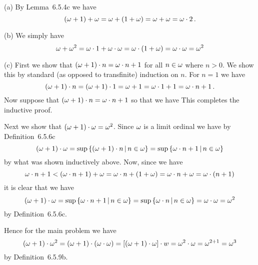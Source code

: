 
\begin{solution}
	(a) By Lemma~6.5.4c we have
    $$
    (\omega + 1) + \omega = \omega + (1 + \omega) = \omega + \omega = \omega \cdot 2 \,.
    $$

    (b) We simply have
    $$
    \omega + \omega^2 = \omega \cdot 1 + \omega \cdot \omega = \omega \cdot (1 + \omega) = \omega \cdot \omega = \omega^2
    $$

    (c) First we show that $(\omega+1) \cdot n = \omega \cdot n + 1$ for all $n \in \omega$ where $n > 0$.
    We show this by standard (as opposed to transfinite) induction on $n$.
    For $n=1$ we have
    $$
    (\omega + 1) \cdot n = (\omega+1) \cdot 1 = \omega + 1 = \omega \cdot 1 + 1 = \omega \cdot n + 1\,.
    $$
    Now suppose that $(\omega + 1) \cdot n = \omega \cdot n + 1$ so that we have
    This completes the inductive proof.

    Next we show that $(\omega + 1) \cdot \omega = \omega^2$.
    Since $\omega$ is a limit ordinal we have by Definition~6.5.6c
    $$
    (\omega + 1) \cdot \omega = \sup\left\{ (\omega + 1) \cdot n \,|\, n \in \omega \right\} = \sup\left\{ \omega \cdot n + 1 \,|\, n \in \omega \right\}
    $$
    by what was shown inductively above.
    Now, since we have
    $$
    \omega \cdot n + 1 < (\omega \cdot n + 1) + \omega = \omega \cdot n + (1 + \omega) = \omega \cdot n + \omega = \omega \cdot (n+1)
    $$
    it is clear that we have
    $$
    (\omega + 1) \cdot \omega = \sup\left\{ \omega \cdot n + 1 \,|\, n \in \omega \right\} = \sup\left\{ \omega \cdot n \,|\, n \in \omega \right\} = \omega \cdot \omega = \omega^2
    $$
    by Definition~6.5.6c.

    Hence for the main problem we have
    $$
    (\omega+1) \cdot \omega^2 = (\omega+1) \cdot (\omega \cdot \omega) = \left[ (\omega+1) \cdot \omega \right] \cdot w = \omega^2 \cdot \omega = \omega^{2+1} = \omega^3
    $$
    by Definition~6.5.9b. \qedsymbol
\end{solution}


